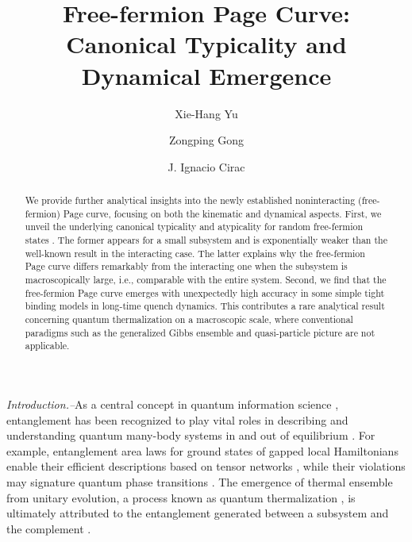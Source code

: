\documentclass[twocolumn,english,prl,aps,superscriptaddress,amsmath,amssymb,floatfix]{revtex4-2}
\begin{document}
\title{Free-fermion %
Page Curve: Canonical Typicality and Dynamical Emergence}
\author{Xie-Hang Yu}
\author{Zongping Gong}
\author{J. Ignacio Cirac}
\begin{abstract}
We provide further analytical insights into the newly established noninteracting (free-fermion) Page curve, focusing on both the kinematic and dynamical aspects. First, we unveil the underlying canonical typicality and atypicality for random free-fermion states%
. The former appears for a small subsystem and is exponentially weaker than the well-known result in the interacting case. The latter explains why the free-fermion Page curve differs remarkably from the interacting one when the subsystem is macroscopically large, i.e., comparable with the entire system. Second, we find that the free-fermion Page curve emerges with unexpectedly high accuracy in some simple tight binding %
models in long-time quench dynamics. This contributes a rare analytical result concerning quantum thermalization on a macroscopic scale, where conventional paradigms such as the generalized Gibbs ensemble and quasi-particle picture are not applicable. 

\end{abstract}
\maketitle


\emph{Introduction.--}As
a central concept in quantum information science \citep{nielsen00},
entanglement has been recognized to play vital roles in describing
and understanding quantum many-body systems in and out of equilibrium
\citep{Luigi2008,relation_entropy_Phase,Eisert2015,Abanin2019}. 
For example, entanglement area laws for ground states
of gapped local Hamiltonians enable their efficient descriptions based
on tensor networks \citep{RevModPhys.93.045003}, 
while their violations may signature quantum phase transitions \citep{Vidal2003,Calabrese2004}. 
The emergence of thermal ensemble from unitary evolution, a process
known as quantum thermalization \cite{Srednicki1994}, is ultimately attributed to the entanglement
generated between a subsystem and the complement \citep{Nandkishore2015}. 
\end{document}
